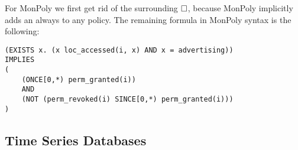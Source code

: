 For MonPoly we first get rid of the surrounding $\square$, because MonPoly implicitly adds an always to any policy.
The remaining formula in MonPoly syntax is the following:

\begin{verbatim}
(EXISTS x. (x loc_accessed(i, x) AND x = advertising)) 
IMPLIES 
(
    (ONCE[0,*) perm_granted(i)) 
    AND 
    (NOT (perm_revoked(i) SINCE[0,*) perm_granted(i)))
)
\end{verbatim}


\subsection{Time Series Databases}